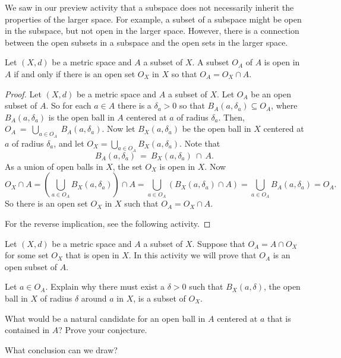 \label{sec_open_closed_sub}

We saw in our preview activity that a subspace does not necessarily inherit the properties of the larger space. For example, a subset of a subspace might be open in the subspace, but not open in the larger space. However, there is a connection between the open subsets in a subspace and the open sets in the larger space. 

\begin{theorem} \label{thm:relatively_open_ms} Let $(X,d)$ be a metric space and $A$ a subset of $X$. A subset $O_A$ of $A$ is open in $A$ if and only if there is an open set $O_X$ in $X$ so that $O_A = O_X \cap A$. 
\end{theorem}

\begin{proof} Let $(X,d)$ be a metric space and $A$ a subset of $X$. Let $O_A$ be an open subset of $A$. So for each $a \in A$ there is a $\delta_a > 0$ so that $B_A(a, \delta_a) \subseteq O_A$, where $B_A(a, \delta_a)$ is the open ball in $A$ centered at $a$ of radius $\delta_a$. Then, $O_A~=~\bigcup_{a \in O_A}~B_A(a, \delta_a)$. Now let $B_X(a, \delta_a)$ be the open ball in $X$ centered at $a$ of radius $\delta_a$, and let $O_X = \bigcup_{a \in O_A} B_X(a, \delta_a)$. Note that \[B_A(a, \delta_a)~=~B_X(a, \delta_a)~\cap~A.\]
As a union of open balls in $X$, the set $O_X$ is open in $X$. Now
\[O_X \cap A = \left(\bigcup_{a \in O_A} B_X(a, \delta_a) \right) \cap A = \bigcup_{a \in O_A} \left( B_X(a, \delta_a) \cap A \right) = \bigcup_{a \in O_A} B_A(a, \delta_a) = O_A.\]
So there is an open set $O_X$ in $X$ such that $O_A = O_X \cap A$. 

For the reverse implication, see the following activity. 
\end{proof}


\begin{activity} Let $(X,d)$ be a metric space and $A$ a subset of $X$. Suppose that $O_A = A \cap O_X$ for some set $O_X$ that is open in $X$. In this activity we will prove that $O_A$ is an open subset of $A$. 
\ba
\item Let $a \in O_A$. Explain why there must exist a $\delta > 0$ such that $B_X(a, \delta)$, the open ball in $X$ of radius $\delta$ around $a$ in $X$, is a subset of $O_X$. 

\item What would be a natural candidate for an open ball in $A$ centered at $a$ that is contained in $A$? Prove your conjecture.

\item What conclusion can we draw?

\ea

\end{activity} 

